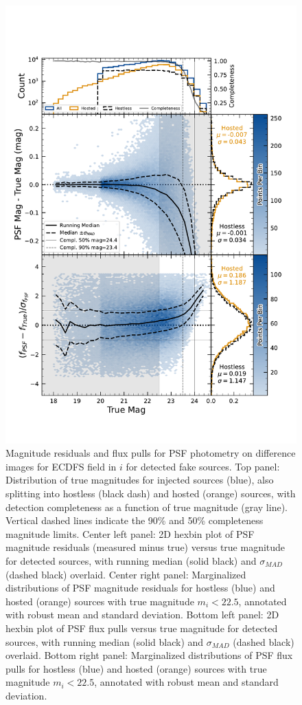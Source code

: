 \begin{figure}
    \centering
    \includegraphics[width=\linewidth]{figures/hexbin_psf_magpull.pdf}
    \caption{Magnitude residuals and flux pulls for \gls{PSF} photometry on difference images for ECDFS field in $i$ for detected fake sources.
     Top panel: Distribution of true magnitudes for injected sources (blue), also splitting into hostless (black dash) and hosted (orange) sources, with detection completeness as a function of true magnitude (gray line). Vertical dashed lines indicate the 90\% and 50\% completeness magnitude limits.
    Center left panel: 2D hexbin plot of PSF magnitude residuals (measured minus true) versus true magnitude for detected sources, with running median (solid black) and $\sigma_{MAD}$ (dashed black) overlaid.
    Center right panel: Marginalized distributions of PSF magnitude residuals for hostless (blue) and hosted (orange) sources with true magnitude $m_i < 22.5$, annotated with robust mean and standard deviation.
    Bottom left panel: 2D hexbin plot of PSF flux pulls versus true magnitude for detected sources, with running median (solid black) and $\sigma_{MAD}$ (dashed black) overlaid.
    Bottom right panel: Marginalized distributions of PSF flux pulls for hostless (blue) and hosted (orange) sources with true magnitude $m_i < 22.5$, annotated with robust mean and standard deviation.
    }
    \label{fig:phot_residual_diffim_fakes}
\end{figure}
%
